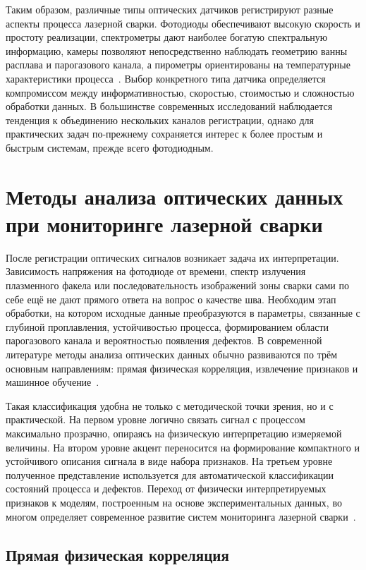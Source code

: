 Таким образом, различные типы оптических датчиков регистрируют разные аспекты процесса лазерной сварки. Фотодиоды обеспечивают высокую скорость и простоту реализации, спектрометры дают наиболее богатую спектральную информацию, камеры позволяют непосредственно наблюдать геометрию ванны расплава и парогазового канала, а пирометры ориентированы на температурные характеристики процесса~\cite{wu2022progress,huang2025laser}. Выбор конкретного типа датчика определяется компромиссом между информативностью, скоростью, стоимостью и сложностью обработки данных. В большинстве современных исследований наблюдается тенденция к объединению нескольких каналов регистрации, однако для практических задач по-прежнему сохраняется интерес к более простым и быстрым системам, прежде всего фотодиодным.


\section{Методы анализа оптических данных при мониторинге лазерной сварки}

После регистрации оптических сигналов возникает задача их интерпретации. Зависимость напряжения на фотодиоде от времени, спектр излучения плазменного факела или последовательность изображений зоны сварки сами по себе ещё не дают прямого ответа на вопрос о качестве шва. Необходим этап обработки, на котором исходные данные преобразуются в параметры, связанные с глубиной проплавления, устойчивостью процесса, формированием области парогазового канала и вероятностью появления дефектов. В современной литературе методы анализа оптических данных обычно развиваются по трём основным направлениям: прямая физическая корреляция, извлечение признаков и машинное обучение~\cite{wu2022progress,huang2025laser,you2014review}.

Такая классификация удобна не только с методической точки зрения, но и с практической. На первом уровне логично связать сигнал с процессом максимально прозрачно, опираясь на физическую интерпретацию измеряемой величины. На втором уровне акцент переносится на формирование компактного и устойчивого описания сигнала в виде набора признаков. На третьем уровне полученное представление используется для автоматической классификации состояний процесса и дефектов. Переход от физически интерпретируемых признаков к моделям, построенным на основе экспериментальных данных, во многом определяет современное развитие систем мониторинга лазерной сварки~\cite{wu2022progress,huang2025laser}.

\subsection{Прямая физическая корреляция}

